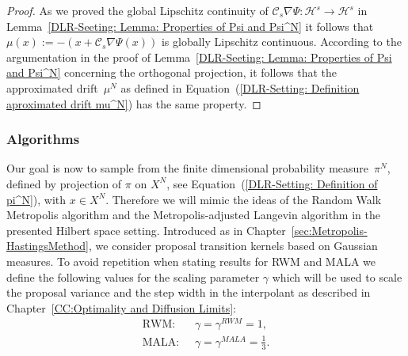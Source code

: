 \begin{proof}
 As we proved the global Lipschitz continuity of $\mathcal{C}_s\nabla \Psi: \mathcal{H}^s \to \mathcal{H}^s$ in Lemma~\ref{DLR-Seeting: Lemma: Properties of Psi and Psi^N} it follows that $\mu(x) := - (x + \mathcal{C}_s \nabla \Psi (x) )$ is globally Lipschitz continuous. According to the argumentation in the proof of Lemma~\ref{DLR-Seeting: Lemma: Properties of Psi and Psi^N} concerning the orthogonal projection, it follows that the approximated drift~$\mu^N$ as defined in Equation~(\ref{DLR-Setting: Definition aproximated drift mu^N}) has the same property.
\end{proof}


\subsubsection{Algorithms}
\label{sec:sub:DLR-Algo}

Our goal is now to sample from the finite dimensional probability measure~$\pi^N$, defined by projection of $\pi$ on $X^N$, see Equation~(\ref{DLR-Setting: Definition of pi^N}), with $x \in X^N$. Therefore we will mimic the ideas of the Random Walk Metropolis algorithm and the Metropolis-adjusted Langevin algorithm in the presented Hilbert space setting. Introduced as in Chapter~\ref{sec:Metropolis-HastingsMethod}, we consider proposal transition kernels based on Gaussian measures. To avoid repetition when stating results for RWM and MALA we define the following values for the scaling parameter $\gamma$ which will be used to scale the proposal variance and the step width in the interpolant as described in Chapter~\ref{CC:Optimality and Diffusion Limits}:
\begin{align}
 \text{RWM: } & \; \gamma = \gamma^{RWM} = 1, \\
 \text{MALA: } & \; \gamma = \gamma^{MALA} = \frac{1}{3}.
\end{align}


